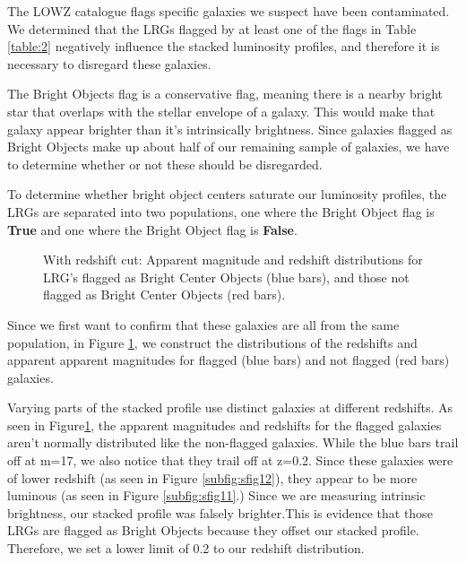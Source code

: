 \documentclass{article}
\begin{document}
The LOWZ catalogue flags specific galaxies we suspect have been contaminated. We determined that the LRGs flagged by at least one of the flags in Table \ref{table:2} negatively influence the stacked luminosity profiles, and therefore it is necessary to disregard these galaxies. 

The Bright Objects flag is a conservative flag, meaning there is a nearby bright star that overlaps with the stellar envelope of a galaxy. This would make that galaxy appear brighter than it's intrinsically brightness. Since galaxies flagged as Bright Objects make up about half of our remaining sample of galaxies, we have to determine whether or not these should be disregarded. 

To determine whether bright object centers saturate our luminosity profiles, the LRGs are separated into two populations, one where the Bright Object flag is \textbf{True} and one where the Bright Object flag is \textbf{False}.

\begin{figure}[htp]
\hfill
{}
 \caption{With redshift cut: Apparent magnitude and redshift distributions for LRG's flagged as Bright Center Objects (blue bars), and those not flagged as Bright Center Objects (red bars). }
\label{fig:mesha1}
\end{figure}

Since we first want to confirm that these galaxies are all from the same population, in Figure \ref{fig:mesha1}, we construct the distributions of the redshifts and apparent apparent magnitudes for flagged (blue bars) and not flagged (red bars) galaxies.

Varying parts of the stacked profile use distinct galaxies at different redshifts. As seen in Figure\ref{fig:mesha1}, the apparent magnitudes and redshifts for the flagged galaxies aren't normally distributed like the non-flagged galaxies. While the blue bars trail off at m=17, we also notice that they trail off at z=0.2. Since these galaxies were of lower redshift (as seen in Figure \ref{subfig:sfig12}), they appear to be more luminous (as seen in Figure \ref{subfig:sfig11}.) Since we are measuring intrinsic brightness, our stacked profile was falsely brighter.This is evidence that those LRGs are flagged as Bright Objects because they offset our stacked profile. Therefore, we set a lower limit of 0.2 to our redshift distribution.  
\end{document}
